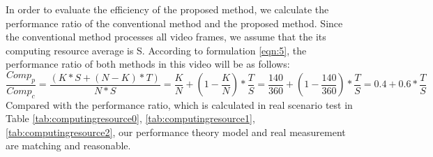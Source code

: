 In order to evaluate the efficiency of the proposed method, we
calculate the performance ratio of the conventional method and the
proposed method. Since the conventional method processes all video frames, we assume that the its computing resource average is S. According to formulation \ref{eqn:5}, the performance ratio of both methods in this video will be as follows:\\
\begin{equation}
\label{eqn:10}
\frac{Comp_{p}}{Comp_{c}}=\frac{(K*S+(N-K)*T)}{N*S}=\frac{K}{N} + (1 - \frac{K}{N})*\frac{T}{S}=\frac{140}{360} + (1 - \frac{140}{360})*\frac{T}{S} = 0.4 + 0.6*\frac{T}{S}
\end{equation}
Compared with the performance ratio, which is calculated in real scenario test in Table \ref{tab:computingresource0}, \ref{tab:computingresource1}, \ref{tab:computingresource2}, our performance theory model and real measurement are matching and reasonable.
